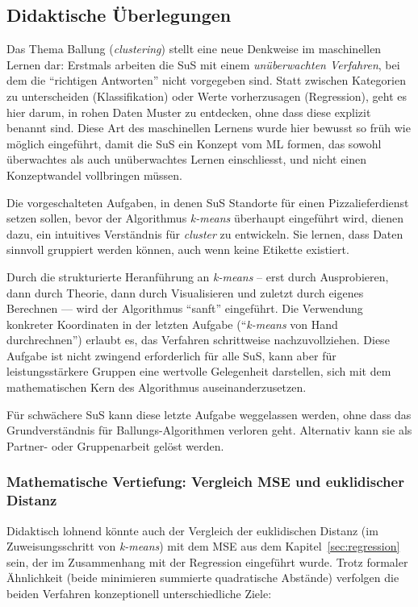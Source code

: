 \subsection*{Didaktische Überlegungen}


Das Thema Ballung (\textit{clustering}) stellt eine neue Denkweise im maschinellen Lernen dar: Erstmals arbeiten die SuS mit einem \emph{unüberwachten Verfahren}, bei dem die ``richtigen Antworten'' nicht vorgegeben sind. Statt zwischen Kategorien zu unterscheiden (Klassifikation) oder Werte vorherzusagen (Regression), geht es hier darum, in rohen Daten Muster zu entdecken, ohne dass diese explizit benannt sind. Diese Art des maschinellen Lernens wurde hier bewusst so früh wie möglich eingeführt, damit die SuS ein Konzept vom ML formen, das sowohl überwachtes als auch unüberwachtes Lernen einschliesst, und nicht einen Konzeptwandel vollbringen müssen.

Die vorgeschalteten Aufgaben, in denen SuS Standorte für einen Pizzalieferdienst setzen sollen, bevor der Algorithmus \textit{k-means} überhaupt eingeführt wird, dienen dazu, ein intuitives Verständnis für \textit{cluster} zu entwickeln. Sie lernen, dass Daten sinnvoll gruppiert werden können, auch wenn keine Etikette existiert.

Durch die strukturierte Heranführung an \textit{k-means} – erst durch Ausprobieren, dann durch Theorie, dann durch Visualisieren und zuletzt durch eigenes Berechnen — wird der Algorithmus ``sanft'' eingeführt. Die Verwendung konkreter Koordinaten in der letzten Aufgabe (``\textit{k-means} von Hand durchrechnen'') erlaubt es, das Verfahren schrittweise nachzuvollziehen. Diese Aufgabe ist nicht zwingend erforderlich für alle SuS, kann aber für leistungsstärkere Gruppen eine wertvolle Gelegenheit darstellen, sich mit dem mathematischen Kern des Algorithmus auseinanderzusetzen.

Für schwächere SuS kann diese letzte Aufgabe weggelassen werden, ohne dass das Grundverständnis für Ballungs-Algorithmen verloren geht. Alternativ kann sie als Partner- oder Gruppenarbeit gelöst werden.

\subsubsection*{Mathematische Vertiefung: Vergleich MSE und euklidischer Distanz}

Didaktisch lohnend könnte auch der Vergleich der euklidischen Distanz (im Zuweisungsschritt von \textit{k-means}) mit dem MSE aus dem Kapitel~\ref{sec:regression} sein, der im Zusammenhang  mit der Regression eingeführt wurde. Trotz formaler Ähnlichkeit (beide minimieren summierte quadratische Abstände) verfolgen die beiden Verfahren konzeptionell unterschiedliche Ziele:

